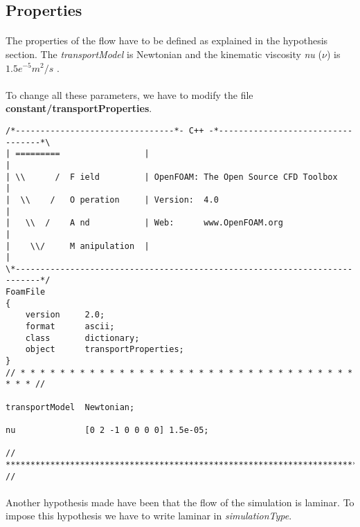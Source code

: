 \subsection{Properties}
\paragraph{}
The properties of the flow have to be defined as explained in the hypothesis section. The \textit{transportModel} is Newtonian and the  kinematic viscosity \textit{nu} ($\nu$) is $1.5e^{-5} m^2/s$ .

\paragraph{}
To change all these parameters, we have to modify the file \textbf{constant/transportProperties}.


\begin{footnotesize}
\begin{verbatim}
/*--------------------------------*- C++ -*----------------------------------*\
| =========                 |                                                 |
| \\      /  F ield         | OpenFOAM: The Open Source CFD Toolbox           |
|  \\    /   O peration     | Version:  4.0                                   |
|   \\  /    A nd           | Web:      www.OpenFOAM.org                      |
|    \\/     M anipulation  |                                                 |
\*---------------------------------------------------------------------------*/
FoamFile
{
    version     2.0;
    format      ascii;
    class       dictionary;
    object      transportProperties;
}
// * * * * * * * * * * * * * * * * * * * * * * * * * * * * * * * * * * * * * //

transportModel  Newtonian;

nu              [0 2 -1 0 0 0 0] 1.5e-05;

// ************************************************************************* //
\end{verbatim}
\end{footnotesize}

\paragraph{}
Another hypothesis made have been that the flow of the simulation is laminar. To impose this hypothesis we have to write laminar in \textit{simulationType}.

